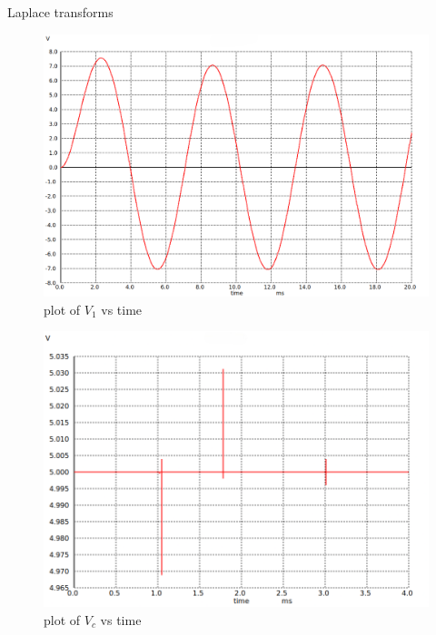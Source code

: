 \documentclass[journal,12pt,twocolumn]{IEEEtran}
\begin{document}
\begin{table}[ht]
    
    \vspace{0.5cm}
    \caption{Laplace transforms}
    \label{tab:Gate.ee.54.1}
\end{table}

\begin{figure}[ht]
    \centering
    \includegraphics[width=1\columnwidth]{figs/fig1.png}
    \caption{plot of $V_1$ vs time}
    \label{fig:fig1.gate.ee.23.54}
\end{figure}

\begin{figure}[ht]
    \centering
    \includegraphics[width=1\columnwidth]{figs/fig2.png}
    \caption{plot of $V_c$ vs time}
    \label{fig:fig2.gate.ee.23.54}
\end{figure}
\end{document}
